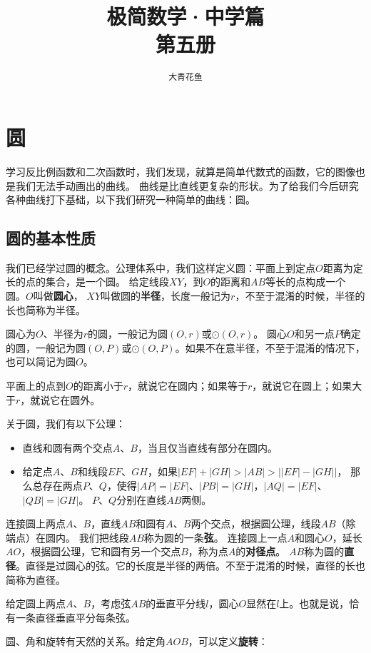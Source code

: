 \documentclass[12pt,UTF8]{ctexbook}
\title{\zihao{0} \bfseries 极简数学·中学篇 \\ 第五册}
\author{\zihao{2} \texttt{大青花鱼}}
\date{}
\begin{document}
\maketitle
\tableofcontents
\newpage

\chapter{圆}

学习反比例函数和二次函数时，我们发现，就算是简单代数式的函数，它的图像也是我们无法手动画出的曲线。
曲线是比直线更复杂的形状。为了给我们今后研究各种曲线打下基础，以下我们研究一种简单的曲线：圆。

\section{圆的基本性质}
我们已经学过圆的概念。公理体系中，我们这样定义圆：平面上到定点$O$距离为定长的点的集合，是一个圆。
给定线段$XY$，到$O$的距离和$AB$等长的点构成一个圆。$O$叫做\textbf{圆心}，
$XY$叫做圆的\textbf{半径}，长度一般记为$r$，不至于混淆的时候，半径的长也简称为半径。

圆心为$O$、半径为$r$的圆，一般记为圆$(O, r)$或$\odot(O, r)$。
圆心$O$和另一点$P$确定的圆，一般记为圆$(O, P)$或$\odot(O, P)$。如果不在意半径，不至于混淆的情况下，
也可以简记为圆$O$。

平面上的点到$O$的距离小于$r$，就说它在圆内；如果等于$r$，就说它在圆上；如果大于$r$，就说它在圆外。

关于圆，我们有以下公理：
\begin{itemize}
    \item 直线和圆有两个交点$A$、$B$，当且仅当直线有部分在圆内。
    \item 给定点$A$、$B$和线段$EF$、$GH$，如果$|EF| + |GH| > |AB| > \left||EF| - |GH|\right|$，
    那么总存在两点$P$、$Q$，使得$|AP| = |EF|$、$|PB| = |GH|$，$|AQ| = |EF|$、$|QB| = |GH|$。
    $P$、$Q$分别在直线$AB$两侧。
\end{itemize}
连接圆上两点$A$、$B$，直线$AB$和圆有$A$、$B$两个交点，根据圆公理，线段$AB$（除端点）在圆内。
我们把线段$AB$称为圆的一条\textbf{弦}。
连接圆上一点$A$和圆心$O$，延长$AO$，根据圆公理，它和圆有另一个交点$B$，称为点$A$的\textbf{对径点}。
$AB$称为圆的\textbf{直径}。直径是过圆心的弦。它的长度是半径的两倍。不至于混淆的时候，直径的长也简称为直径。

给定圆上两点$A$、$B$，考虑弦$AB$的垂直平分线$l$，圆心$O$显然在$l$上。也就是说，恰有一条直径垂直平分每条弦。

圆、角和旋转有天然的关系。给定角$AOB$，可以定义\textbf{旋转}：
\end{document}
